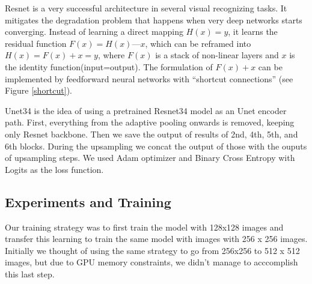 \documentclass[conference]{IEEEtran}
\begin{document}
Resnet is a very successful architecture in several visual recognizing tasks\cite{he}. It mitigates the degradation problem that happens when very deep networks starts converging. Instead of learning a direct mapping $H(x) = y$, it learns the residual function  $F(x) = H(x) — x$, which can be reframed into $H(x) = F(x)+x = y$, where $F(x)$ is a stack of non-linear layers and $x$ is the identity function(input=output). The formulation of $F(x)+x$ can be implemented by feedforward neural networks with “shortcut connections” (see Figure \ref{shortcut}).

Unet34 is the idea of using a pretrained Resnet34 model as an Unet encoder path\cite{fastai}. First, everything from the adaptive pooling onwards is removed, keeping only Resnet backbone. Then we save the output of results of 2nd, 4th, 5th, and 6th blocks. During the upsampling we concat the output of those with the ouputs of upsampling steps. We used Adam optimizer and Binary Cross Entropy with Logits as the loss function.

\subsection{Experiments and Training}
Our training strategy was to first train the model with 128x128 images and transfer this learning to train the same model with images with 256 x 256 images. Initially we thought of using the same strategy to go from 256x256 to 512 x 512 images, but due to GPU memory constraints, we didn't manage to acccomplish this last step.
\end{document}
